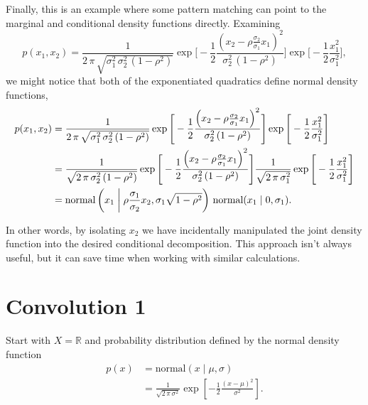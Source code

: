\documentclass[11pt, oneside]{article}
\begin{document}
Finally, this is an example where some pattern matching can point to the marginal  
and conditional density functions directly.  Examining
%
\begin{equation*}
p( x_{1}, x_{2} )
=
\frac{1}{ 2 \, \pi \, \sqrt{ \sigma_{1}^{2} \, \sigma_{2}^{2} \, (1 - \rho^{2} ) } }
\exp \Bigg[
  -\frac{1}{2}
      \frac{ 
      \left(
        x_{2} - \rho \frac{ \sigma_{2} }{ \sigma_{1} } x_{1}
      \right)^{2}
    }{
      \sigma_{2}^{2} \, (1 - \rho^{2} )
    }
\Bigg]
\exp \Bigg[
  -\frac{1}{2} \frac{  x_{1}^{2} }{ \sigma_{1}^{2} }
\Bigg],
\end{equation*}
%
we might notice that both of the exponentiated quadratics define normal
density functions,
%
\begin{align*}
p( x_{1}, x_{2} )
&=
\frac{1}{ 2 \, \pi \, \sqrt{ \sigma_{1}^{2} \, \sigma_{2}^{2} \, (1 - \rho^{2} ) } }
\exp \Bigg[
  -\frac{1}{2}
      \frac{ 
      \left(
        x_{2} - \rho \frac{ \sigma_{2} }{ \sigma_{1} } x_{1}
      \right)^{2}
    }{
      \sigma_{2}^{2} \, (1 - \rho^{2} )
    }
\Bigg]
\exp \Bigg[
  -\frac{1}{2} \frac{  x_{1}^{2} }{ \sigma_{1}^{2} }
\Bigg]
\\
&=
\frac{1}{ \sqrt{ 2 \, \pi \, \sigma_{2}^{2} \, (1 - \rho^{2} ) } }
\exp \Bigg[
  -\frac{1}{2}
      \frac{ 
      \left(
        x_{2} - \rho \frac{ \sigma_{2} }{ \sigma_{1} } x_{1}
      \right)^{2}
    }{
      \sigma_{2}^{2} \, (1 - \rho^{2} )
    }
\Bigg]
\frac{1}{ \sqrt{ 2 \, \pi \, \sigma_{1}^{2} } }
\exp \Bigg[
  -\frac{1}{2} \frac{  x_{1}^{2} }{ \sigma_{1}^{2} }
\Bigg]
\\
&=
\text{normal} \left( 
  x_{1} \biggm| 
  \rho \frac{ \sigma_{1} }{ \sigma_{2} } x_{2}, 
  \sigma_{1} \sqrt{ 1 - \rho^{2} } 
\right) \,
\text{normal} ( x_{1} \mid 0, \sigma_{1} ).
\end{align*}

In other words, by isolating $x_{2}$ we have incidentally manipulated 
the joint density function into the desired conditional decomposition.
This approach isn't always useful, but it can save time when working
with similar calculations.

\section{Convolution 1}

Start with $X = \mathbb{R}$ and probability distribution defined by 
the normal density function
%
\begin{align*}
p( x )
&=
\text{normal} ( x \mid \mu, \sigma )
\\
&=
\frac{1}{ \sqrt{ 2 \, \pi \, \sigma^{2} } }
\exp \left[
  -\frac{1}{2} \frac{ ( x - \mu )^{2} }{ \sigma^{2} }
\right].
\end{align*}
\end{document}
